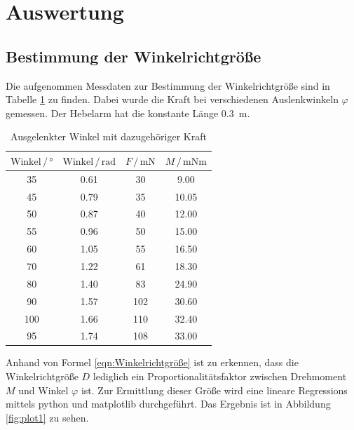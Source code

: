 \section{Auswertung}
\label{sec:Auswertung}

\subsection{Bestimmung der Winkelrichtgröße}

Die aufgenommen Messdaten zur Bestimmung der Winkelrichtgröße sind in Tabelle \ref{tab:Messdaten1}
zu finden. Dabei wurde die Kraft bei verschiedenen Auslenkwinkeln $\varphi$ gemessen. Der Hebelarm
hat die konstante Länge \SI{0.3}{\meter}.

\begin{table}
\centering
\caption{Ausgelenkter Winkel mit dazugehöriger Kraft}
\label{tab:Messdaten1}
\begin{tabular}{c c c c}
\toprule
$\text{Winkel} \,/\, °$ & $\text{Winkel} \,/\, \text{rad}$ & $F \,/\, \si{\milli\newton}$ & $M \,/\, \si{\milli\newton\meter}$\\
\midrule
 35 & 0.61 &  30 &  9.00\\
 45 & 0.79 &  35 & 10.05\\
 50 & 0.87 &  40 & 12.00\\
 55 & 0.96 &  50 & 15.00\\
 60 & 1.05 &  55 & 16.50\\
 70 & 1.22 &  61 & 18.30\\
 80 & 1.40 &  83 & 24.90\\
 90 & 1.57 & 102 & 30.60\\
100 & 1.66 & 110 & 32.40\\
 95 & 1.74 & 108 & 33.00\\
\bottomrule
\end{tabular}
\end{table}

Anhand von Formel \eqref{eqn:Winkelrichtgröße} ist zu erkennen, dass die Winkelrichtgröße $D$ 
lediglich ein Proportionalitätsfaktor zwischen Drehmoment $M$ und Winkel $\varphi$ ist. Zur Ermittlung 
dieser Größe wird eine lineare Regressions mittels python und matplotlib durchgeführt. 
Das Ergebnis ist in Abbildung \ref{fig:plot1} zu sehen. 


